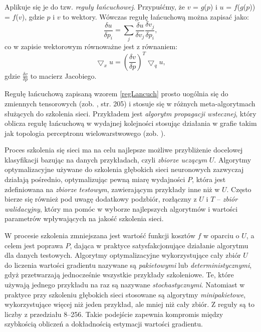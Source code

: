 Aplikuje się je do tzw. \textit{reguły łańcuchowej}. Przypuśćmy, że $v$ = $g$($p$) i $u$ = $f$($g$($p$)) = $f$($v$), gdzie $p$ i $v$ to wektory. Wówczas regułę łańcuchową można zapisać jako:
\begin{equation}
\frac{\delta u}{\delta p_i} = \sum_{j} \frac{\delta u}{\delta v_j} \frac{\delta v_j}{\delta p_i}, 
\end{equation}
co w zapisie wektorowym równoważne jest z równaniem:
\begin{equation}
\label{regLancuch}
\bigtriangledown_x u = (\frac{\delta v}{\delta p})^T \bigtriangledown_q u, 
\end{equation}
gdzie $\frac{\delta v}{\delta p}$ to macierz Jacobiego. 

Regułę łańcuchową zapisaną wzorem \ref{regLancuch} prosto uogólnia się do zmiennych tensorowych (zob. \cite{Goodfellow-et-al-2016}, str. 205) i stosuje się w różnych meta-algorytmach służących \linebreak do szkolenia sieci. Przykładem jest \textit{algorytm propagacji wstecznej}, który oblicza regułę łańcuchową w wydajnej kolejności stosując działania w grafie takim jak topologia perceptronu wielowarstwowego (zob. \cite{Goodfellow-et-al-2016}).

Proces szkolenia się sieci ma na celu najlepsze możliwe przybliżenie docelowej klasyfikacji bazując na danych przykładach, czyli \textit{zbiorze uczącym} $U$. Algorytmy optymalizacyjne używane do szkolenia głębokich sieci neuronowych zazwyczaj działają pośrednio, optymalizując pewną miarę wydajności $P$, która jest zdefiniowana na \textit{zbiorze testowym}, zawierającym przykłady inne niż w $U$. Często bierze się również pod uwagę dodatkowy podzbiór, rozłączny z $U$ i $T$ -- \textit{zbiór walidacyjny}, który ma pomóc w wyborze najlepszych algorytmów i wartości parametrów wpływających na jakość szkolenia sieci.

W procesie szkolenia zmniejszana jest wartość funkcji kosztów $f$ w oparciu \linebreak o $U$, a celem jest poprawa $P$, dająca w praktyce satysfakcjonujące działanie algorytmu dla danych testowych. Algorytmy optymalizacyjne wykorzystujące cały zbiór $U$ do liczenia wartości gradientu nazywane są \textit{pakietowymi} lub \textit{deterministycznymi}, gdyż przetwarzają jednocześnie wszystkie przykłady szkoleniowe. Te, które używają jednego przykładu na raz są nazywane \textit{stochastycznymi}. Natomiast w praktyce przy szkoleniu głębokich sieci stosowane są algorytmy \textit{minipakietowe}, wykorzystujące więcej niż jeden przykład, ale mniej niż cały zbiór. Z reguły są to liczby \linebreak z przedziału 8--256. Takie podejście zapewnia kompromis między szybkością obliczeń a dokładnością estymacji wartości gradientu.

